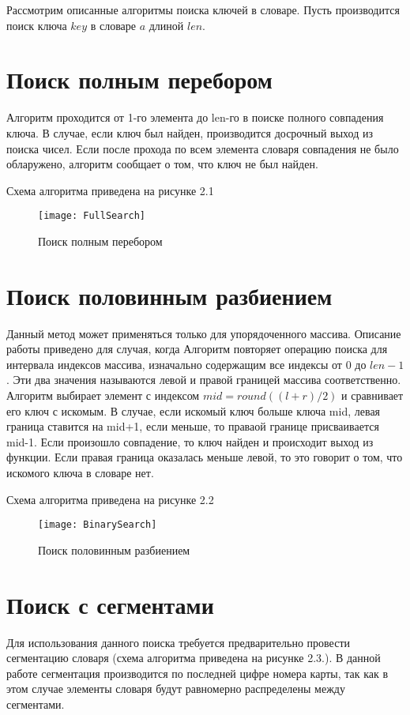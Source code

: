 Рассмотрим описанные алгоритмы поиска ключей в словаре. Пусть производится поиск ключа $key$ в словаре $a$ длиной $len$.

\section{Поиск полным перебором}
Алгоритм проходится от 1-го элемента до len-го в поиске полного совпадения ключа. В случае, если ключ был найден, производится досрочный выход из поиска чисел. Если после прохода по всем элемента словаря совпадения не было обларужено, алгоритм сообщает о том, что ключ не был найден.

Схема алгоритма приведена на рисунке 2.1
\begin{figure}[h]
	\begin{center}
		{\texttt{[image: FullSearch]}}
		\caption{Поиск полным перебором}
	\end{center}
\end{figure}

\section{Поиск половинным разбиением}
Данный метод может применяться только для упорядоченного массива. Описание работы приведено для случая, когда Алгоритм повторяет операцию поиска для интервала индексов массива, изначально содержащим все индексы от 0 до $len-1$. Эти два значения называются левой и правой границей массива соответственно. Алгоритм выбирает элемент с индексом $mid = round((l+r)/2)$ и сравнивает его ключ с искомым. В случае, если искомый ключ больше ключа mid, левая граница ставится на mid+1, если меньше, то праваой границе присваивается mid-1. Если произошло совпадение, то ключ найден и происходит выход из функции. Если правая граница оказалась меньше левой, то это говорит о том, что искомого ключа в словаре нет.

Схема алгоритма приведена на рисунке 2.2
\begin{figure}[h]
	\begin{center}
		{\texttt{[image: BinarySearch]}}
		\caption{Поиск половинным разбиением}
	\end{center}
\end{figure}

\section{Поиск с сегментами}
Для использования данного поиска требуется предварительно провести сегментацию словаря (схема алгоритма приведена на рисунке 2.3.). В данной работе сегментация производится по последней цифре номера карты, так как в этом случае элементы словаря будут равномерно распределены между сегментами.

